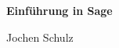 \usepackage[psamsfonts]{amssymb}
\usepackage{amsmath}
\usepackage[svgnames]{xcolor} %







\begin{center}
\textbf{\LARGE Einf\"uhrung in Sage}\\
\end{center}
\begin{minipage}{6cm}
Jochen Schulz
\end{minipage}\hfill